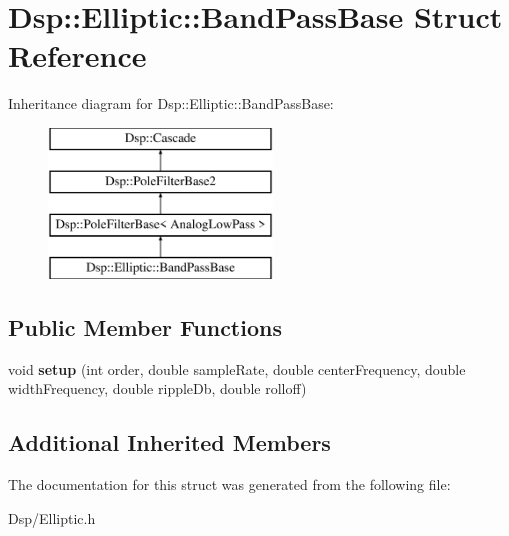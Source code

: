 \hypertarget{structDsp_1_1Elliptic_1_1BandPassBase}{\section{Dsp\-:\-:Elliptic\-:\-:Band\-Pass\-Base Struct Reference}
\label{structDsp_1_1Elliptic_1_1BandPassBase}
}
Inheritance diagram for Dsp\-:\-:Elliptic\-:\-:Band\-Pass\-Base\-:\begin{figure}[H]
\begin{center}
\leavevmode
\includegraphics[height=4.000000cm]{structDsp_1_1Elliptic_1_1BandPassBase}
\end{center}
\end{figure}
\subsection*{Public Member Functions}
\begin{DoxyCompactItemize}
\item 
\hypertarget{structDsp_1_1Elliptic_1_1BandPassBase_a7f772337fc4956d7701f47deacda8644}{void {\bfseries setup} (int order, double sample\-Rate, double center\-Frequency, double width\-Frequency, double ripple\-Db, double rolloff)}\label{structDsp_1_1Elliptic_1_1BandPassBase_a7f772337fc4956d7701f47deacda8644}

\end{DoxyCompactItemize}
\subsection*{Additional Inherited Members}


The documentation for this struct was generated from the following file\-:\begin{DoxyCompactItemize}
\item 
Dsp/Elliptic.\-h\end{DoxyCompactItemize}
